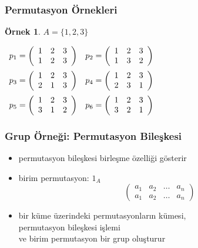 \documentclass[dvipsnames]{beamer}
\theoremstyle{definition}
\theoremstyle{example}
\newtheorem{ornek}[theorem]{Örnek}
\theoremstyle{plain}
\begin{document}
\begin{frame}
  \frametitle{Permutasyon Örnekleri}

  \begin{ornek}
    $A = \{1,2,3\}$

    \medskip
    $\begin{array}{cc}
      p_1 = \left(
        \begin{array}{ccc}
          1 & 2 & 3\\
          1 & 2 & 3
        \end{array}
      \right) &
      p_2 = \left(
        \begin{array}{ccc}
          1 & 2 & 3\\
          1 & 3 & 2
        \end{array}
      \right)\medskip\\
      p_3 = \left(
        \begin{array}{ccc}
          1 & 2 & 3\\
          2 & 1 & 3
        \end{array}
      \right) &
      p_4 = \left(
        \begin{array}{ccc}
          1 & 2 & 3\\
          2 & 3 & 1
        \end{array}
      \right)\medskip\\
      p_5 = \left(
        \begin{array}{ccc}
          1 & 2 & 3\\
          3 & 1 & 2
        \end{array}
      \right) &
      p_6 = \left(
        \begin{array}{ccc}
          1 & 2 & 3\\
          3 & 2 & 1
        \end{array}
      \right)
    \end{array}$
  \end{ornek}
\end{frame}

\begin{frame}
  \frametitle{Grup Örneği: Permutasyon Bileşkesi}

  \begin{itemize}
    \item permutasyon bileşkesi birleşme özelliği gösterir
    \item birim permutasyon: $1_A$
    \[\left(
      \begin{array}{cccc}
         a_1 & a_2 & \dots & a_n\\
         a_1 & a_2 & \dots & a_n
      \end{array}
    \right)\]

    \pause
    \medskip
    \item bir küme üzerindeki permutasyonların kümesi,\\
      permutasyon bileşkesi işlemi\\
      ve birim permutasyon bir grup oluşturur
  \end{itemize}
\end{frame}
\end{document}
